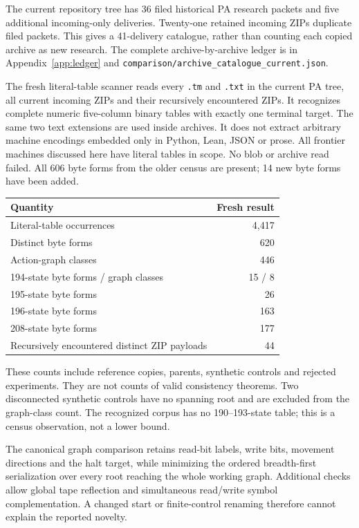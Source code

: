 \documentclass[11pt,letterpaper]{article}
\newcommand{\file}[1]{\texttt{\nolinkurl{#1}}}
\begin{document}
The current repository tree has 36 filed historical PA research packets
and five additional incoming-only deliveries. Twenty-one retained incoming
ZIPs duplicate filed packets. This gives a 41-delivery catalogue, rather
than counting each copied archive as new research. The complete
archive-by-archive ledger is in Appendix~\ref{app:ledger} and
\file{comparison/archive_catalogue_current.json}.

The fresh literal-table scanner reads every \file{.tm} and \file{.txt} in
the current PA tree, all current incoming ZIPs and their recursively
encountered ZIPs. It recognizes complete numeric five-column binary tables
with exactly one terminal target. The same two text extensions are used inside archives. It does not
extract arbitrary machine encodings embedded only in Python, Lean, JSON
or prose. All frontier machines discussed here have literal tables in
scope. No blob or archive read failed. All 606 byte forms from the older
census are present; 14 new byte forms have been added.

\begin{center}
\begin{tabular}{@{}lr@{}}
\toprule
Quantity & Fresh result\\\midrule
Literal-table occurrences &4,417\\
Distinct byte forms &620\\
Action-graph classes &446\\
194-state byte forms / graph classes &15 / 8\\
195-state byte forms &26\\
196-state byte forms &163\\
208-state byte forms &177\\
Recursively encountered distinct ZIP payloads &44\\
\bottomrule
\end{tabular}
\end{center}
These counts include reference copies, parents, synthetic controls and
rejected experiments. They are not counts of valid consistency theorems.
Two disconnected synthetic controls have no spanning root and are excluded
from the graph-class count. The recognized corpus has no 190--193-state
table; this is a census observation, not a lower bound.

The canonical graph comparison retains read-bit labels, write bits,
movement directions and the halt target, while minimizing the ordered
breadth-first serialization over every root reaching the whole working
graph. Additional checks allow global tape reflection and simultaneous
read/write symbol complementation. A changed start or finite-control
renaming therefore cannot explain the reported novelty.
\end{document}
